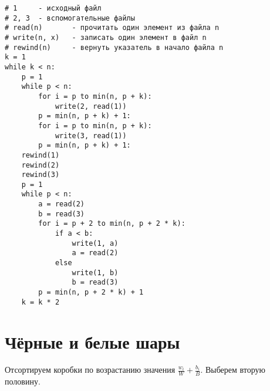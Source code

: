 \documentclass{article}
\begin{document}
\begin{verbatim}
# 1     - исходный файл
# 2, 3  - вспомогательные файлы
# read(n)       - прочитать один элемент из файла n
# write(n, x)   - записать один элемент в файл n
# rewind(n)     - вернуть указатель в начало файла n
k = 1
while k < n:
    p = 1
    while p < n:
        for i = p to min(n, p + k):
            write(2, read(1))
        p = min(n, p + k) + 1:
        for i = p to min(n, p + k):
            write(3, read(1))
        p = min(n, p + k) + 1:
    rewind(1)
    rewind(2)
    rewind(3)
    p = 1
    while p < n:
        a = read(2)
        b = read(3)
        for i = p + 2 to min(n, p + 2 * k):
            if a < b:
                write(1, a)
                a = read(2)
            else
                write(1, b)
                b = read(3)
        p = min(n, p + 2 * k) + 1
    k = k * 2
\end{verbatim}

\pagebreak

\section{Чёрные и белые шары}

Отсортируем коробки по возрастанию значения $\frac{w_i}{W} + \frac{b_i}{B}$.
Выберем вторую половину.
\end{document}
